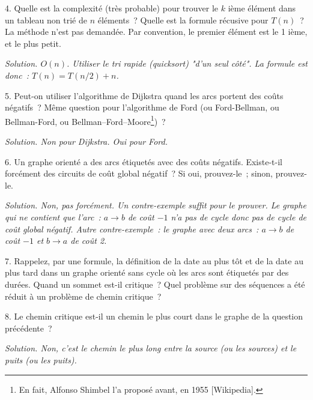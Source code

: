 \documentclass[11pt]{article}
\begin{document}
4.  Quelle est la complexité (très probable) pour trouver le $k$ ième élément
dans un tableau non trié de $n$ éléments~? Quelle est la formule récusive pour $T(n)$~? La méthode n'est pas demandée.
Par convention, le premier élément est le 1 ième, et le plus petit. 

\ifcorrige
{\it Solution. $O(n)$. Utiliser le tri rapide (quicksort) "d'un seul côté".
La formule est donc~: $T(n)=T(n/2)+n$.
}
\else
\fi

5. Peut-on utiliser l'algorithme de Dijkstra quand les arcs portent des coûts négatifs~? Même question pour l'algorithme de  Ford
(ou Ford-Bellman, ou Bellman-Ford, ou Bellman–Ford–Moore\footnote{En fait, Alfonso Shimbel l'a proposé avant, en 1955 [Wikipedia].})~? %

\ifcorrige
{\it Solution. Non pour Dijkstra. Oui pour Ford.}
\else
\fi


6. Un graphe orienté a des arcs étiquetés avec des coûts négatifs. Existe-t-il forcément des circuits de coût global négatif~? Si oui, prouvez-le~; sinon, prouvez-le.

\ifcorrige
{\it Solution. Non, pas forcément. Un contre-exemple suffit pour le prouver. Le graphe qui ne contient que l'arc~: $a\rightarrow b$ de coût $-1$ n'a pas de cycle donc pas de cycle de coût global négatif. Autre contre-exemple~: le graphe avec deux arcs~: $a\rightarrow b$ de coût $-1$ et $b\rightarrow a$ de coût 2. 
}
\else
\fi

7. Rappelez, par une formule, la définition de la date au plus tôt et de la date au plus tard dans un graphe orienté sans cycle où les arcs sont étiquetés par des durées.  Quand un sommet est-il critique~? Quel problème sur des séquences a été réduit  à un problème de chemin critique~?

\else
\fi

8. Le chemin critique est-il un chemin le plus court dans le graphe de la question précédente~?

\ifcorrige
{\it Solution. Non, c'est le chemin le plus long entre la source (ou les sources) et le puits (ou les puits).
}
\else
\fi
\end{document}
